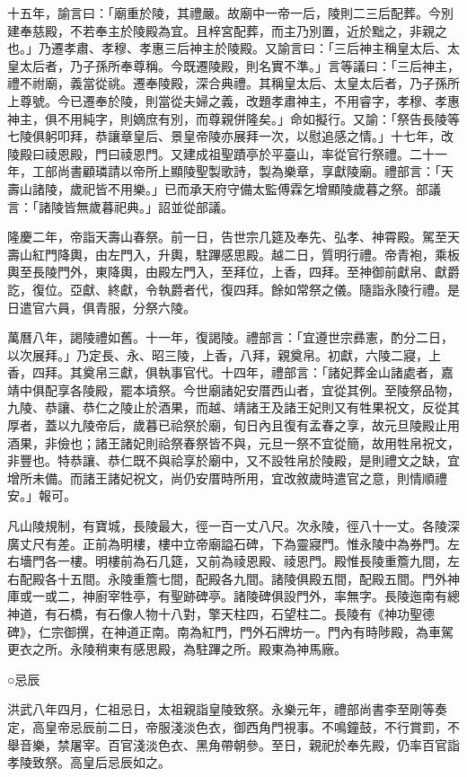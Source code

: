 十五年，諭言曰：「廟重於陵，其禮嚴。故廟中一帝一后，陵則二三后配葬。今別建奉慈殿，不若奉主於陵殿為宜。且梓宮配葬，而主乃別置，近於黜之，非親之也。」乃遷孝肅、孝穆、孝惠三后神主於陵殿。又諭言曰：「三后神主稱皇太后、太皇太后者，乃子孫所奉尊稱。今既遷陵殿，則名實不準。」言等議曰：「三后神主，禮不祔廟，義當從祧。遷奉陵殿，深合典禮。其稱皇太后、太皇太后者，乃子孫所上尊號。今已遷奉於陵，則當從夫婦之義，改題孝肅神主，不用睿字，孝穆、孝惠神主，俱不用純字，則嫡庶有別，而尊親併隆矣。」命如擬行。又諭：「祭告長陵等七陵俱躬叩拜，恭讓章皇后、景皇帝陵亦展拜一次，以慰追感之情。」十七年，改陵殿曰祾恩殿，門曰祾恩門。又建成祖聖蹟亭於平臺山，率從官行祭禮。二十一年，工部尚書顧璘請以帝所上顯陵聖製歌詩，製為樂章，享獻陵廟。禮部言：「天壽山諸陵，歲祀皆不用樂。」已而承天府守備太監傅霖乞增顯陵歲暮之祭。部議言：「諸陵皆無歲暮祀典。」詔並從部議。

隆慶二年，帝詣天壽山春祭。前一日，告世宗几筵及奉先、弘孝、神霄殿。駕至天壽山紅門降輿，由左門入，升輿，駐蹕感思殿。越二日，質明行禮。帝青袍，乘板輿至長陵門外，東降輿，由殿左門入，至拜位，上香，四拜。至神御前獻帛、獻爵訖，復位。亞獻、終獻，令執爵者代，復四拜。餘如常祭之儀。隨詣永陵行禮。是日遣官六員，俱青服，分祭六陵。

萬曆八年，謁陵禮如舊。十一年，復謁陵。禮部言：「宜遵世宗彞憲，酌分二日，以次展拜。」乃定長、永、昭三陵，上香，八拜，親奠帛。初獻，六陵二寢，上香，四拜。其奠帛三獻，俱執事官代。十四年，禮部言：「諸妃葬金山諸處者，嘉靖中俱配享各陵殿，罷本墳祭。今世廟諸妃安厝西山者，宜從其例。至陵祭品物，九陵、恭讓、恭仁之陵止於酒果，而越、靖諸王及諸王妃則又有牲果祝文，反從其厚者，蓋以九陵帝后，歲暮已祫祭於廟，旬日內且復有孟春之享，故元旦陵殿止用酒果，非儉也；諸王諸妃則祫祭春祭皆不與，元旦一祭不宜從簡，故用牲帛祝文，非豐也。特恭讓、恭仁既不與祫享於廟中，又不設牲帛於陵殿，是則禮文之缺，宜增所未備。而諸王諸妃祝文，尚仍安厝時所用，宜改敘歲時遣官之意，則情順禮安。」報可。

凡山陵規制，有寶城，長陵最大，徑一百一丈八尺。次永陵，徑八十一丈。各陵深廣丈尺有差。正前為明樓，樓中立帝廟謚石碑，下為靈寢門。惟永陵中為券門。左右墻門各一樓。明樓前為石几筵，又前為祾恩殿、祾恩門。殿惟長陵重簷九間，左右配殿各十五間。永陵重簷七間，配殿各九間。諸陵俱殿五間，配殿五間。門外神庫或一或二，神廚宰牲亭，有聖跡碑亭。諸陵碑俱設門外，率無字。長陵迤南有總神道，有石橋，有石像人物十八對，擎天柱四，石望柱二。長陵有《神功聖德碑》，仁宗御撰，在神道正南。南為紅門，門外石牌坊一。門內有時陟殿，為車駕更衣之所。永陵稍東有感思殿，為駐蹕之所。殿東為神馬廠。

○忌辰

洪武八年四月，仁祖忌日，太祖親詣皇陵致祭。永樂元年，禮部尚書李至剛等奏定，高皇帝忌辰前二日，帝服淺淡色衣，御西角門視事。不鳴鐘鼓，不行賞罰，不舉音樂，禁屠宰。百官淺淡色衣、黑角帶朝參。至日，親祀於奉先殿，仍率百官詣孝陵致祭。高皇后忌辰如之。

